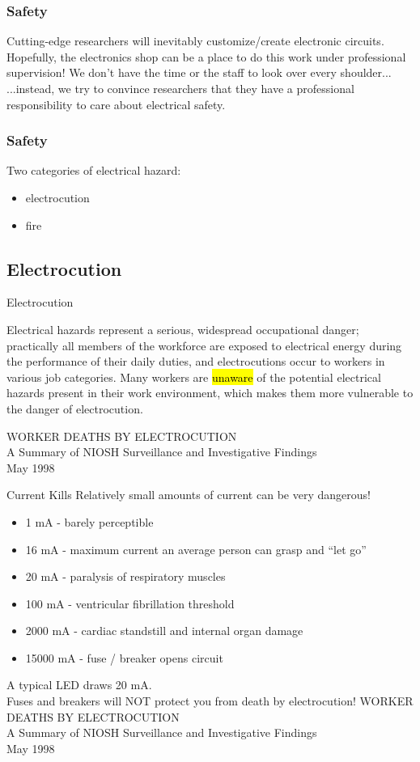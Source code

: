 \documentclass{presentation}
\begin{document}
\begin{frame}\frametitle{Safety}
  Cutting-edge researchers will inevitably customize/create electronic circuits.
  \vfill
  Hopefully, the electronics shop can be a place to do this work under professional supervision!
  \vfill
  We don't have the time or the staff to look over every shoulder...
  ...instead, we try to convince researchers that they have a professional responsibility to care about electrical safety.
\end{frame}

\begin{frame}\frametitle{Safety}
  Two categories of electrical hazard:
  \begin{itemize}
    \item electrocution
    \item fire
  \end{itemize}
\end{frame}

\subsection{Electrocution}

\begin{frame}{Electrocution}
  \begin{snugshade}
    Electrical hazards represent a serious, widespread occupational danger; practically all members of the workforce are exposed to electrical energy during the performance of their daily duties, and electrocutions occur to workers in various job categories.
    Many workers are \hl{unaware} of the potential electrical hazards present in their work environment, which makes them more vulnerable to the danger of electrocution.
  \end{snugshade}
  \vfill
  \tiny
  WORKER DEATHS BY ELECTROCUTION \\
  A Summary of NIOSH Surveillance and Investigative Findings \\
  May 1998
\end{frame}


\begin{frame}{Current Kills}
  Relatively small amounts of current can be very dangerous!
  \begin{itemize}
    \item 1 mA - barely perceptible
    \item 16 mA - maximum current an average person can grasp and ``let go''
    \item 20 mA - paralysis of respiratory muscles
    \item 100 mA - ventricular fibrillation threshold
    \item 2000 mA - cardiac standstill and internal organ damage
    \item 15000 mA - fuse / breaker opens circuit
  \end{itemize}
  A typical LED draws 20 mA. \\
  Fuses and breakers will NOT protect you from death by electrocution!
  \vfill
  \tiny
  WORKER DEATHS BY ELECTROCUTION \\
  A Summary of NIOSH Surveillance and Investigative Findings \\
  May 1998
\end{frame}
\end{document}
